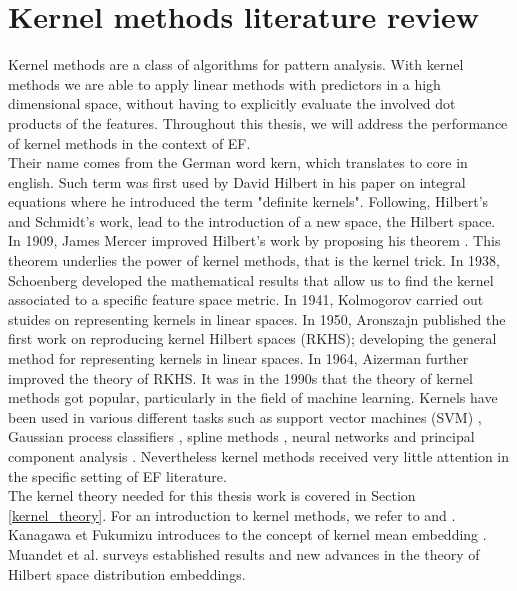 \section{Kernel methods literature review}
Kernel methods are a class of algorithms for pattern analysis.
With kernel methods we are able to apply linear methods with predictors in a high dimensional space, without having to explicitly evaluate the involved dot products of the features.
Throughout this thesis, we will address the performance of kernel methods in the context of EF.
\\
Their name comes from the German word kern, which translates to core in english. Such term was first used by David Hilbert in his paper on integral equations \cite{hilbert} where he introduced the term "definite kernels". Following, Hilbert's and Schmidt's work, \cite{schmidt} lead to the introduction of a new space, the Hilbert space.
In 1909, James Mercer improved Hilbert's work by proposing his theorem \cite{mercer}. This theorem underlies the power of kernel methods, that is the kernel trick.
In 1938, Schoenberg \cite{schoenberg} developed the mathematical results that allow us to find the kernel associated to a specific feature space metric.
In 1941, Kolmogorov \cite{kolmogorov} carried out stuides on representing kernels in linear spaces.
In 1950, Aronszajn \cite{aronszajn} published the first work on reproducing kernel Hilbert spaces (RKHS); developing the general method for representing kernels in linear spaces.
In 1964, Aizerman \cite{aizerman} further improved the theory of RKHS.
It was in the 1990s that the theory of kernel methods got popular, particularly in the field of machine learning. Kernels have been used in various different tasks such as support vector machines (SVM) \cite{vapnik1} \cite{vapnik2}, Gaussian process classifiers \cite{williams}, spline methods \cite{wahba}, neural networks \cite{poggio} and principal component analysis \cite{pca_scholkopf}.
Nevertheless kernel methods received very little attention in the specific setting of EF literature.
\\
The kernel theory needed for this thesis work is covered in Section \ref{kernel_theory}. 
For an introduction to kernel methods, we refer to \cite{learning_with_kernels, hofmann2006review} and \cite{shawe2004kernel}.
\\
Kanagawa et Fukumizu introduces to the concept of kernel mean embedding \cite{pmlr}. Muandet et al. \cite{Muandet_2017} surveys established results and new advances in the theory of Hilbert space distribution embeddings. 
